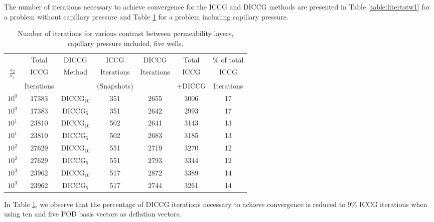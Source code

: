 \documentclass[12pt]{article}
\begin{document}
{The number of iterations necessary to achieve convergence for the ICCG and DICCG methods are presented in Table \ref{table:litertotw1} for a problem without capillary pressure and Table \ref{table:litertotw2} for a problem including capillary pressure. \par

\begin{table}[!ht]\centering
\begin{minipage}{1\textwidth}
 \centering
\begin{tabular}{ ||c|c||c|c|c|c|c||} 
\hline
&Total& DICCG & ICCG&DICCG &Total&\% of total\\ 
         $\frac{\kappa_2}{\kappa_1}$  & ICCG       & Method & Iterations & Iterations&ICCG& ICCG\\ 
                           &  Iterations&        &  (Snapshots)   & &+DICCG&Iterations \\
\hline  
$10^{0}$ &17383& DICCG$_{10}$&351&2655&3006&17 \\ 
\hline  
$10^{0}$ &17383& DICCG$_{5}$&351&2642&2993&17 \\ 
\hline   
$10^{1}$ &23810& DICCG$_{10}$&502&2641&3143&13 \\ 
\hline  
$10^{1}$ &23810& DICCG$_{5}$&502&2683&3185&13 \\   
\hline  
$10^{2}$ &27629& DICCG$_{10}$&551&2719&3270&12 \\ 
\hline  
$10^{2}$ &27629& DICCG$_{5}$&551&2793&3344&12 \\ 
\hline  
$10^{3}$ &23962& DICCG$_{10}$&517&2872&3389&14 \\ 
\hline  
$10^{3}$ &23962& DICCG$_{5}$&517&2744&3261&14 \\ 
\hline  
\end{tabular} 
\caption{Number of iterations  for various contrast between permeability layers, capillary pressure included, five wells.}\label{table:litertotw2} 
\end{minipage}  
\end{table} 

In Table \ref{table:litertotw2}, we observe that the percentage of DICCG iterations necessary to achieve convergence is reduced to 9\% ICCG iterations when using ten and five POD basis vectors as deflation vectors. \par


}
\end{document}
